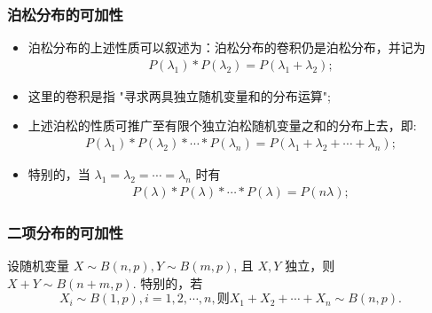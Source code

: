 \documentclass[Prob-All.tex]{subfiles}
\begin{document}
 \begin{frame}
 	\frametitle{泊松分布的可加性}

 	\begin{itemize}[<+-|alert@+>]
 		\item 泊松分布的上述性质可以叙述为：泊松分布的卷积仍是泊松分布，并记为
 		\begin{eqnarray*}
 			P(\lambda_1)*P(\lambda_2)=P(\lambda_1+\lambda_2);
 		\end{eqnarray*}
 		\item 这里的卷积是指 "寻求两具独立随机变量和的分布运算";
 		\item 上述泊松的性质可推广至有限个独立泊松随机变量之和的分布上去，即:
 		\begin{eqnarray*}
 			P(\lambda_1)*P(\lambda_2)*\cdots *P(\lambda_n)=P(\lambda_1+\lambda_2+\cdots+\lambda_n);
 		\end{eqnarray*}
 		\item 特别的，当 $\lambda_1=\lambda_2=\cdots=\lambda_n$ 时有
 		\begin{eqnarray*}
 			P(\lambda)*P(\lambda)*\cdots *P(\lambda)=P(n\lambda);
 		\end{eqnarray*}

 	\end{itemize}
 \end{frame}
 \begin{frame}
 	\frametitle{二项分布的可加性}
 	\begin{exam}[二项分布的可加性]
 		设随机变量 $X\sim B (n,p), Y\sim B (m,p)$, 且 $X,Y$ 独立，则 $X+Y\sim B (n+m,p)$. 特别的，若 $$X_i\sim B (1,p), i=1,2,\cdots, n, \mbox{则} X_1+X_2+\cdots+X_n\sim B (n,p).$$
 	\end{exam}
 \end{frame}
\end{document}
